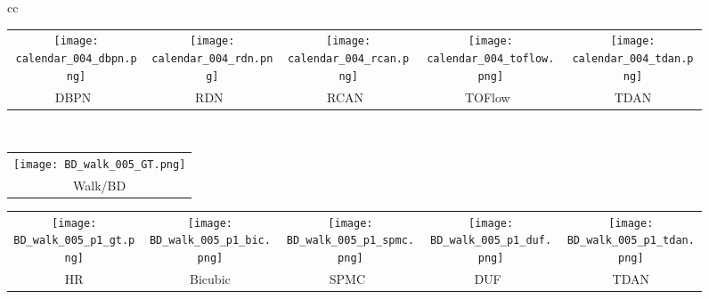 \documentclass[10pt,twocolumn,letterpaper]{article}
\newcommand{\widthscalefive}{0.125}
\begin{document}
\begin{figure*}
\begin{tabular}{cc}
\begin{adjustbox}{valign=t}
\begin{tabular}{ccccc}
				\\
				\texttt{[image: calendar\_004\_dbpn.png]} \hspace{-1.5mm} &
				\texttt{[image: calendar\_004\_rdn.png]} \hspace{-1.5mm} &
				\texttt{[image: calendar\_004\_rcan.png]} \hspace{-1.5mm} &
				\texttt{[image: calendar\_004\_toflow.png]}\hspace{-1.5mm} &
				\texttt{[image: calendar\_004\_tdan.png]}
				\\
				DBPN~\cite{haris2018deep} \hspace{-1.5mm} &
				RDN~\cite{zhang2018residual} \hspace{-1.5mm} &
				RCAN~\cite{zhang2018image} \hspace{-1.5mm} &
				TOFlow~\cite{xue2017video} \hspace{-1.5mm} &
				TDAN
				\\
			\end{tabular}
			\end{adjustbox}

         \\
          \begin{adjustbox}{valign=t}
\begin{tabular}{c}
				\texttt{[image: BD\_walk\_005\_GT.png]}
				\\
				Walk/BD
			
			\end{tabular}
		\end{adjustbox}
		\hspace{-2.3mm}
		\begin{adjustbox}{valign=t}
\begin{tabular}{ccccc}
				\texttt{[image: BD\_walk\_005\_p1\_gt.png]} \hspace{-1.5mm} &
				\texttt{[image: BD\_walk\_005\_p1\_bic.png]} \hspace{-1.5mm} &
				\texttt{[image: BD\_walk\_005\_p1\_spmc.png]} \hspace{-1.5mm} &
				\texttt{[image: BD\_walk\_005\_p1\_duf.png]}\hspace{-1.5mm} &
				\texttt{[image: BD\_walk\_005\_p1\_tdan.png]}
				\\
				HR \hspace{-1.5mm} &
				Bicubic \hspace{-1.5mm} &
				SPMC~\cite{tao2017detail} \hspace{-1.5mm} &
				DUF~\cite{jo2018deep}\hspace{-1.5mm} &
				TDAN


\end{tabular}
\end{adjustbox}
\end{tabular}
\end{figure*}
\end{document}
